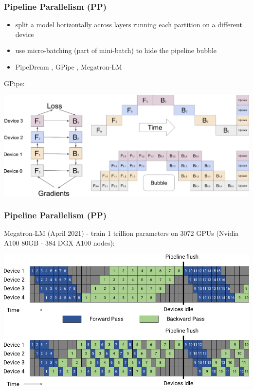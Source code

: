 \documentclass{beamer}
\begin{document}
\begin{frame}
    \frametitle{Pipeline Parallelism (PP)}
    \begin{itemize}
        \item split a model horizontally across layers running each partition on a different device
        \item use micro-batching (part of mini-batch) to hide the pipeline bubble
        \item PipeDream \cite{pipedream}, GPipe \cite{gpipe}, Megatron-LM \cite{megatronlm} \cite{megatronlm_2}
    \end{itemize}
    GPipe:
    \begin{center}
        \includegraphics[scale=0.85]{img/gpipe.png}
    \end{center}
\end{frame}

\begin{frame}
    \frametitle{Pipeline Parallelism (PP)}
    Megatron-LM (April 2021) \cite{megatronlm_2} - train 1 trillion parameters  on 3072 GPUs (Nvidia A100 80GB - 384 DGX A100 nodes):
    \begin{center}
        \includegraphics[scale=1.22]{img/megatron_lm.png}
    \end{center}
\end{frame}
\end{document}
